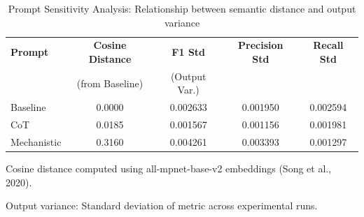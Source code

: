 \begin{table}[htbp]
\centreing
\caption{Prompt Sensitivity Analysis: Relationship between semantic distance and output variance}
\label{tab:sensitivity_analysis}
\begin{tabular}{lcccc}
\toprule
\textbf{Prompt} & \textbf{Cosine Distance} & \textbf{F1 Std} & \textbf{Precision Std} & \textbf{Recall Std} \\
 & (from Baseline) & (Output Var.) & & \\
\midrule
Baseline & 0.0000 & 0.002633 & 0.001950 & 0.002594 \\
CoT & 0.0185 & 0.001567 & 0.001156 & 0.001981 \\
Mechanistic & 0.3160 & 0.004261 & 0.003393 & 0.001297 \\
\bottomrule
\end{tabular}
\begin{tablenotes}
\small
\item Cosine distance computed using all-mpnet-base-v2 embeddings (Song et al., 2020).
\item Output variance: Standard deviation of metric across experimental runs.
\end{tablenotes}
\end{table}